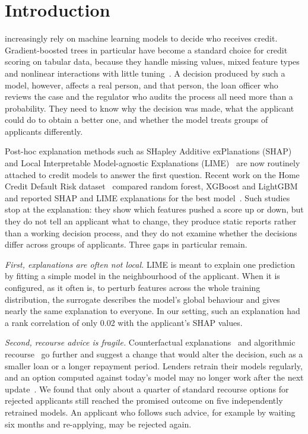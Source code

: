 \section{Introduction}
\label{sec:introduction}

 increasingly rely on machine learning models to decide who receives credit. Gradient-boosted
trees in particular have become a standard choice for credit scoring on tabular data, because they handle missing
values, mixed feature types and nonlinear interactions with little tuning~\cite{lessmann2015benchmark,ke2017lightgbm}.
A decision produced by such a model, however, affects a real person, and that person, the loan officer who
reviews the case and the regulator who audits the process all need more than a probability. They need to know why
the decision was made, what the applicant could do to obtain a better one, and whether the model treats groups of
applicants differently.

Post-hoc explanation methods such as SHapley Additive exPlanations (SHAP)~\cite{lundberg2017shap,lundberg2020tree}
and Local Interpretable Model-agnostic Explanations (LIME)~\cite{ribeiro2016lime} are now routinely attached to credit models to answer the first question. Recent work
on the Home Credit Default Risk dataset~\cite{homecredit2018} compared random forest, XGBoost and LightGBM and
reported SHAP and LIME explanations for the best model~\cite{shreya2025base}. Such studies stop at the explanation:
they show which features pushed a score up or down, but they do not tell an applicant what to change, they produce
static reports rather than a working decision process, and they do not examine whether the decisions differ across
groups of applicants. Three gaps in particular remain.

\emph{First, explanations are often not local.} LIME is meant to explain one prediction by fitting a simple model
in the neighbourhood of the applicant. When it is configured, as it often is, to perturb features across the whole
training distribution, the surrogate describes the model's global behaviour and gives nearly the same explanation to
everyone. In our setting, such an explanation had a rank correlation of only 0.02 with the applicant's SHAP values.

\emph{Second, recourse advice is fragile.} Counterfactual explanations~\cite{wachter2018counterfactual} and
algorithmic recourse~\cite{ustun2019recourse,karimi2022survey} go further and suggest a change that would alter the
decision, such as a smaller loan or a longer repayment period. Lenders retrain their models regularly, and an
option computed against today's model may no longer work after the next update~\cite{rawal2020shift,pawelczyk2020multiplicity}.
We found that only about a quarter of standard recourse options for rejected applicants still reached the promised
outcome on five independently retrained models. An applicant who follows such advice, for example by waiting six
months and re-applying, may be rejected again.

